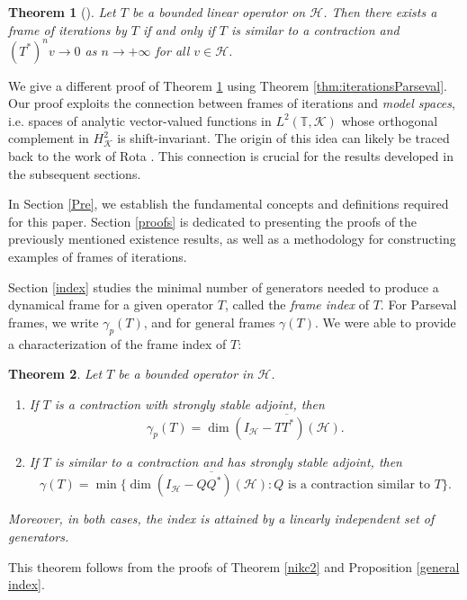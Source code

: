 \documentclass[a4paper,12pt]{amsart}
\def\HH{{\mathcal{H}}}
\def\KK{{\mathcal{K}}}
\def\T{{\mathbb{T}}}
\newtheorem{theorem}{Theorem}[section]
\theoremstyle{definition}
\begin{document}
\begin{theorem}[\cite{CMPP20}]\label{existencia}
Let $T$ be a bounded linear operator on $\HH$. Then there exists a frame of iterations by $T$ if and only if $T$ is similar to a contraction and $(T^*)^nv\to0$ as $n\to+\infty$ for all $v\in\HH$.
\end{theorem}

We give a different proof of Theorem \ref{existencia} using Theorem \ref{thm:iterationsParseval}. Our proof exploits the connection between frames of iterations and {\em model spaces}, i.e. spaces of analytic vector-valued functions in $L^2(\T,\KK)$ whose orthogonal complement in $H^2_\KK$ is shift-invariant. The origin of this idea can likely be traced back to the work of Rota \cite{R}. This connection is crucial for the results developed in the subsequent sections.


In Section \ref{Pre}, we establish the fundamental concepts and definitions required for this paper. Section \ref{proofs} is dedicated to presenting the proofs of the previously mentioned existence results, as well as a methodology for constructing examples of frames of iterations.


Section \ref{index} studies the minimal number of generators needed to produce a dynamical frame for a given operator $T$, called the {\em frame index} of $T$. For Parseval frames, we write $\gamma_p(T)$, and for general frames $\gamma(T)$.  We were able to provide a characterization of the frame index of $T$:
\begin{theorem}\label{thm-index-intro}
Let $T$ be a bounded operator in $\mathcal H$.
\begin{enumerate}[label=(\roman*),ref=(\roman*)]
\item If $T$ is a contraction with strongly stable adjoint, then 
\begin{equation*}
 \gamma_p(T)=\dim\overline{(I_{\HH}-TT^*)(\HH)}.
\end{equation*}
\item 
If 
$T$ is similar to a contraction and has  strongly stable adjoint, then 
\begin{equation*}
\gamma(T)=\min\{\dim\overline{(I_{\HH}-QQ^*)(\HH)} :Q\text{ is a contraction similar to }T\}.
\end{equation*}
\end{enumerate}
Moreover, in both cases, the index is attained by a linearly independent set of generators.
\end{theorem}

This theorem follows from the proofs of Theorem \ref{nikc2} and Proposition  \ref{general index}.
\end{document}
